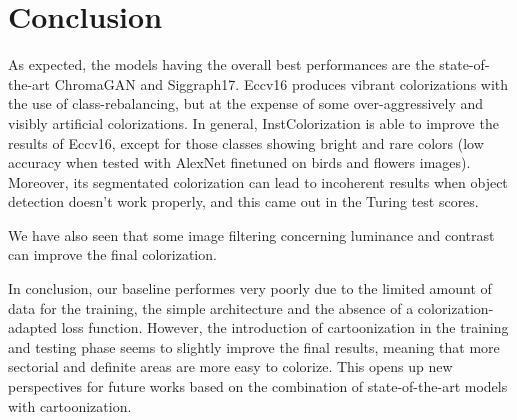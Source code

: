 \section{Conclusion}
As expected, the models having the overall best performances are the state-of-the-art ChromaGAN and Siggraph17. Eccv16 produces vibrant colorizations with the use of class-rebalancing, but at
the expense of some over-aggressively and visibly artificial colorizations. In general, InstColorization is able to improve the results of Eccv16, except for those classes showing bright and rare colors (low accuracy when tested with AlexNet finetuned on birds and flowers images). Moreover, its segmentated colorization can lead to incoherent results when object detection doesn't work properly, and this came out in the Turing test scores. 

We have also seen that some image filtering concerning luminance and contrast can improve the final colorization.

In conclusion, our baseline performes very poorly due to the limited amount of data for the training, the simple architecture and the absence of a colorization-adapted loss function. However, the introduction of cartoonization in the training and testing phase seems to slightly improve the final results, meaning that more sectorial and definite areas are more easy to colorize. This opens up new perspectives for future works based on the combination of state-of-the-art models with cartoonization.

